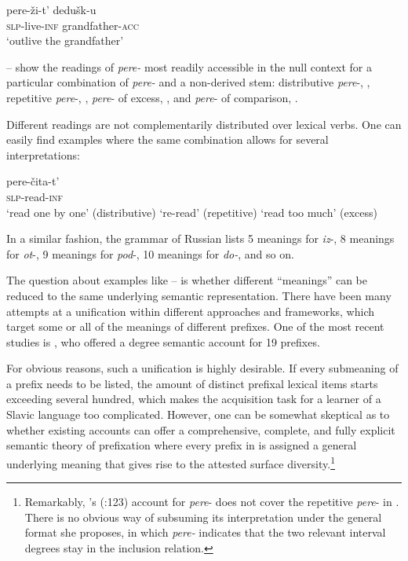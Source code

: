 \documentclass[output=paper,colorlinks,citecolor=brown]{langscibook}
\begin{document}
\gll  pere-ži-t’  dedušk-u\\
\textsc{slp}-live-\textsc{inf}  grandfather-\textsc{acc}\\
\glt    ‘outlive the grandfather’\label{ex:tatevosov:17d}
\z
\z

\noindent {}-- show the readings of \textit{pere-} most readily accessible in the null context for a particular combination of \textit{pere-} and a non-derived stem: distributive \textit{pere}-, , repetitive \textit{pere}-, , \textit{pere}- of excess, , and \textit{pere}- of comparison, .

Different readings are not complementarily distributed over lexical verbs. One can easily find examples where the same combination allows for several interpretations: 

\ea   pere-čita-t’\\\label{tat:ex:18}
  \textsc{slp}-read-\textsc{inf}\\
\ea ‘read one by one’ (distributive)
\ex ‘re-read’ (repetitive)
\ex ‘read too much’ (excess)
\z
\z

\noindent In a similar fashion, the grammar of Russian \citep{Svedova1980} lists 5 meanings for \textit{iz}-, 8 meanings for \textit{ot}-, 9 meanings for \textit{pod}-, 10 meanings for \textit{do-}, and so on. 

The question about examples like -- is whether different “meanings” can be reduced to the same underlying semantic representation. There have been many attempts at a unification within different approaches and frameworks, which target some or all of the meanings of different prefixes. One of the most recent studies is \citet{Kagan15}, who offered a degree semantic account for 19 prefixes. 

For obvious reasons, such a unification is highly desirable. If every submeaning of a prefix needs to be listed, the amount of distinct prefixal lexical items starts exceeding several hundred, which makes the acquisition task for a learner of a Slavic language too complicated. However, one can be somewhat skeptical as to whether existing accounts can offer a comprehensive, complete, and fully explicit semantic theory of prefixation where every prefix in  is assigned a general underlying meaning that gives rise to the attested surface diversity.\footnote{Remarkably, \citeauthor{Kagan15}'s (\citeyear{Kagan15}:123) account for \textit{pere}- does not cover the repetitive \textit{pere}- in . There is no obvious way of subsuming its interpretation under the general format she proposes, in which \textit{pere-} indicates that the two relevant interval degrees stay in the inclusion relation.}
\end{document}
